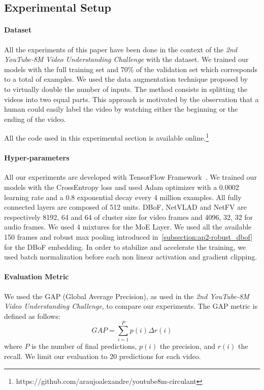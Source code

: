 \subsection{Experimental Setup}

\paragraph{Dataset}
All the experiments of this paper have been done in the context of the \emph{2nd YouTube-8M Video Understanding Challenge} with the \yt dataset.
We trained our models with the full training set and 70\% of the validation set which corresponds to a total of  examples.
We used the data augmentation technique proposed by~\cite{skalic2017deep} to virtually double the number of inputs. 
The method consists in splitting the videos into two equal parts.
This approach is motivated by the observation that a human could easily label the video by watching either the beginning or the ending of the video. 

All the code used in this experimental section is available online.\footnote{https://github.com/araujoalexandre/youtube8m-circulant}

\paragraph{Hyper-parameters}
All our experiments are developed with TensorFlow Framework~\cite{tensorflow2015-whitepaper}.
We trained our models with the CrossEntropy loss and used Adam optimizer with a 0.0002 learning rate and a 0.8 exponential decay every 4 million examples.
All fully connected layers are composed of 512 units.
DBoF, NetVLAD and NetFV are respectively 8192, 64 and 64 of cluster size for video frames and 4096, 32, 32 for audio frames.
We used 4 mixtures for the MoE Layer.
We used all the available 150 frames and robust max pooling introduced in~\ref{subsection:ap2-robust_dbof} for the DBoF embedding.
In order to stabilize and accelerate the training, we used batch normalization before each non linear activation and gradient clipping. 

\paragraph{Evaluation Metric}
We used the GAP (Global Average Precision), as used in the \emph{2nd YouTube-8M Video Understanding Challenge}, to compare our experiments. The GAP metric is defined as follows:
\begin{equation}
  GAP = \sum_{i=1}^{P}p(i) \Delta r(i)
\end{equation}
where $P$ is the number of final predictions, $p(i)$ the precision, and $r(i)$ the recall.
We limit our evaluation to 20 predictions for each video. 

